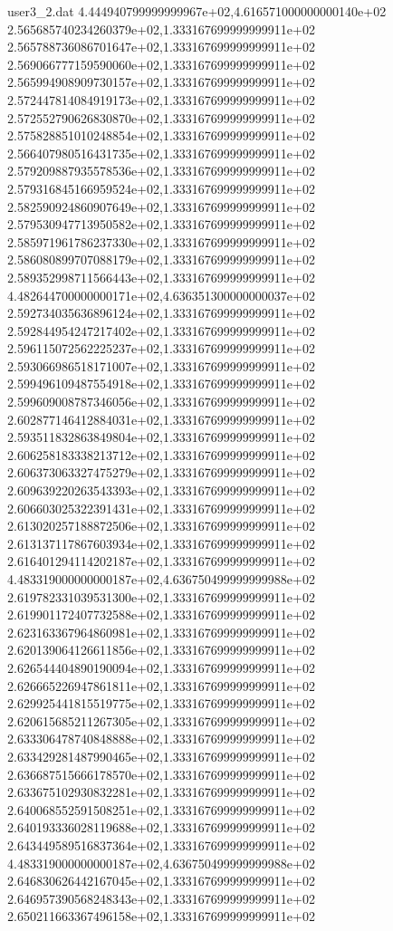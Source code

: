 \begin{filecontents}{user3_2.dat}
4.444940799999999967e+02,4.616571000000000140e+02
2.565685740234260379e+02,1.333167699999999911e+02
2.565788736086701647e+02,1.333167699999999911e+02
2.569066777159590060e+02,1.333167699999999911e+02
2.565994908909730157e+02,1.333167699999999911e+02
2.572447814084919173e+02,1.333167699999999911e+02
2.572552790626830870e+02,1.333167699999999911e+02
2.575828851010248854e+02,1.333167699999999911e+02
2.566407980516431735e+02,1.333167699999999911e+02
2.579209887935578536e+02,1.333167699999999911e+02
2.579316845166959524e+02,1.333167699999999911e+02
2.582590924860907649e+02,1.333167699999999911e+02
2.579530947713950582e+02,1.333167699999999911e+02
2.585971961786237330e+02,1.333167699999999911e+02
2.586080899707088179e+02,1.333167699999999911e+02
2.589352998711566443e+02,1.333167699999999911e+02
4.482644700000000171e+02,4.636351300000000037e+02
2.592734035636896124e+02,1.333167699999999911e+02
2.592844954247217402e+02,1.333167699999999911e+02
2.596115072562225237e+02,1.333167699999999911e+02
2.593066986518171007e+02,1.333167699999999911e+02
2.599496109487554918e+02,1.333167699999999911e+02
2.599609008787346056e+02,1.333167699999999911e+02
2.602877146412884031e+02,1.333167699999999911e+02
2.593511832863849804e+02,1.333167699999999911e+02
2.606258183338213712e+02,1.333167699999999911e+02
2.606373063327475279e+02,1.333167699999999911e+02
2.609639220263543393e+02,1.333167699999999911e+02
2.606603025322391431e+02,1.333167699999999911e+02
2.613020257188872506e+02,1.333167699999999911e+02
2.613137117867603934e+02,1.333167699999999911e+02
2.616401294114202187e+02,1.333167699999999911e+02
4.483319000000000187e+02,4.636750499999999988e+02
2.619782331039531300e+02,1.333167699999999911e+02
2.619901172407732588e+02,1.333167699999999911e+02
2.623163367964860981e+02,1.333167699999999911e+02
2.620139064126611856e+02,1.333167699999999911e+02
2.626544404890190094e+02,1.333167699999999911e+02
2.626665226947861811e+02,1.333167699999999911e+02
2.629925441815519775e+02,1.333167699999999911e+02
2.620615685211267305e+02,1.333167699999999911e+02
2.633306478740848888e+02,1.333167699999999911e+02
2.633429281487990465e+02,1.333167699999999911e+02
2.636687515666178570e+02,1.333167699999999911e+02
2.633675102930832281e+02,1.333167699999999911e+02
2.640068552591508251e+02,1.333167699999999911e+02
2.640193336028119688e+02,1.333167699999999911e+02
2.643449589516837364e+02,1.333167699999999911e+02
4.483319000000000187e+02,4.636750499999999988e+02
2.646830626442167045e+02,1.333167699999999911e+02
2.646957390568248343e+02,1.333167699999999911e+02
2.650211663367496158e+02,1.333167699999999911e+02

\end{filecontents}
